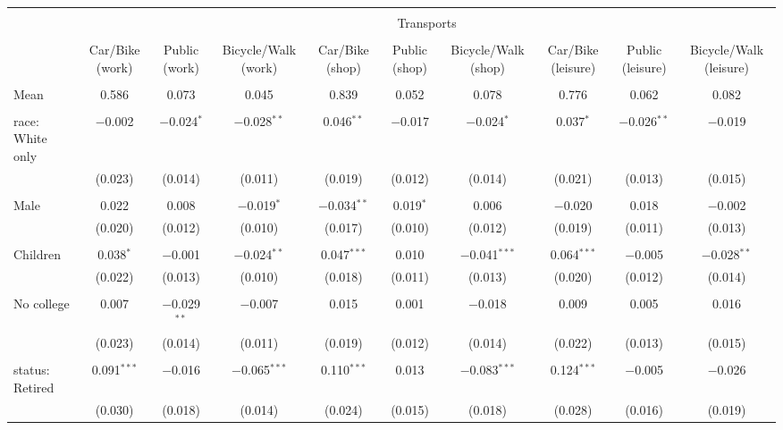 
\begin{tabular}{@{\extracolsep{5pt}}lccccccccc} 
\\[-1.8ex]\hline 
\hline \\[-1.8ex] 
 & \multicolumn{9}{c}{Transports} \\ 
\cline{2-10} 
\\[-1.8ex] & Car/Bike (work) & Public (work) & Bicycle/Walk (work) & Car/Bike (shop) & Public (shop) & Bicycle/Walk (shop) & Car/Bike (leisure) & Public (leisure) & Bicycle/Walk (leisure) \\ 
\hline \\[-1.8ex] 
 Mean & 0.586 & 0.073 & 0.045 & 0.839 & 0.052 & 0.078 & 0.776 & 0.062 & 0.082  \\ \hline \\[-1.8ex] race: White only & $-$0.002 & $-$0.024$^{*}$ & $-$0.028$^{**}$ & 0.046$^{**}$ & $-$0.017 & $-$0.024$^{*}$ & 0.037$^{*}$ & $-$0.026$^{**}$ & $-$0.019 \\ 
  & (0.023) & (0.014) & (0.011) & (0.019) & (0.012) & (0.014) & (0.021) & (0.013) & (0.015) \\ 
  & & & & & & & & & \\ 
 Male & 0.022 & 0.008 & $-$0.019$^{*}$ & $-$0.034$^{**}$ & 0.019$^{*}$ & 0.006 & $-$0.020 & 0.018 & $-$0.002 \\ 
  & (0.020) & (0.012) & (0.010) & (0.017) & (0.010) & (0.012) & (0.019) & (0.011) & (0.013) \\ 
  & & & & & & & & & \\ 
 Children & 0.038$^{*}$ & $-$0.001 & $-$0.024$^{**}$ & 0.047$^{***}$ & 0.010 & $-$0.041$^{***}$ & 0.064$^{***}$ & $-$0.005 & $-$0.028$^{**}$ \\ 
  & (0.022) & (0.013) & (0.010) & (0.018) & (0.011) & (0.013) & (0.020) & (0.012) & (0.014) \\ 
  & & & & & & & & & \\ 
 No college & 0.007 & $-$0.029$^{**}$ & $-$0.007 & 0.015 & 0.001 & $-$0.018 & 0.009 & 0.005 & 0.016 \\ 
  & (0.023) & (0.014) & (0.011) & (0.019) & (0.012) & (0.014) & (0.022) & (0.013) & (0.015) \\ 
  & & & & & & & & & \\ 
 status: Retired & 0.091$^{***}$ & $-$0.016 & $-$0.065$^{***}$ & 0.110$^{***}$ & 0.013 & $-$0.083$^{***}$ & 0.124$^{***}$ & $-$0.005 & $-$0.026 \\ 
  & (0.030) & (0.018) & (0.014) & (0.024) & (0.015) & (0.018) & (0.028) & (0.016) & (0.019) \\ 

\end{tabular}
